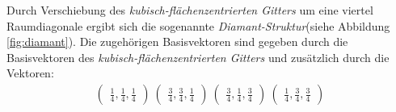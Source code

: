 Durch Verschiebung des \textit{kubisch-flächenzentrierten Gitters}
um eine viertel Raumdiagonale ergibt sich die sogenannte
\textit{Diamant-Struktur}(siehe Abbildung \ref{fig:diamant}).
Die zugehörigen Basisvektoren sind gegeben durch die
Basisvektoren des \textit{kubisch-flächenzentrierten Gitters}
und zusätzlich durch die Vektoren:
\begin{align}
   \label{eqn:4}
   \begin{pmatrix}
    \frac{1}{4}, \frac{1}{4}, \frac{1}{4}
  \end{pmatrix}\
  \begin{pmatrix}
    \frac{3}{4}, \frac{3}{4}, \frac{1}{4}
  \end{pmatrix}\
  \begin{pmatrix}
    \frac{3}{4}, \frac{1}{4}, \frac{3}{4}
  \end{pmatrix}\
  \begin{pmatrix}
    \frac{1}{4}, \frac{3}{4}, \frac{3}{4}
  \end{pmatrix}
\end{align}

